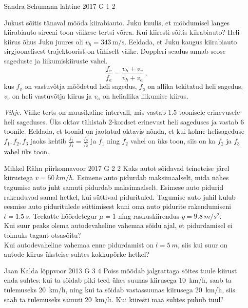 \documentclass[11pt, twoside]{article}
\begin{document}
{%
{Sandra Schumann} %
{lahtine} %
{2017} %
{G 1} %
{2} %
{
\ifStatement
Jukust sõitis tänaval mööda kiirabiauto. Juku kuulis, et möödumisel langes kiirabiauto sireeni toon väikese tertsi võrra. Kui kiiresti sõitis kiirabiauto? Heli kiirus õhus Juku juures oli $v_h = \SI{343}{\meter\per\second}$. Eeldada, et Juku kaugus kiirabiauto sirgjoonelisest trajektoorist on tühiselt väike. Doppleri seadus annab seose sageduste ja liikumiskiiruste vahel.
\[ \frac{f_v}{f_a} = \frac{v_h + v_v}{v_h + v_a} \ , \]
kus \(f_v\) on vastuvõtja mõõdetud heli sagedus, \(f_a\) on allika tekitatud heli sagedus, \(v_v\) on heli vastuvõtja kiirus ja \(v_a\) on heliallika liikumise kiirus.

\emph{Vihje}. Väike terts on muusikaline intervall, mis vastab \num{1.5}-toonisele erinevusele heli sageduses. Üks oktav tähistab 2-kordset erinevust heli sageduses ja vastab 6 toonile. Eeldada, et toonid on jaotatud oktavis nõnda, et kui kolme helisageduse $f_1, f_2, f_3$ jaoks kehtib $\frac{f_2}{f_1} = \frac{f_3}{f_2}$ ja $f_1$ ning $f_2$ vahel on üks toon, siis on ka $f_2$ ja $f_3$ vahel üks toon.
\fi
}

{Mihkel Rähn} %
{piirkonnavoor} %
{2017} %
{G 2} %
{2} %
{
\ifStatement
Kaks autot sõidavad teineteise järel kiirustega $v=\SI{50}{km/h}$. Esimene auto pidurdab maksimaalselt, mida nähes tagumise auto juht samuti pidurdab maksimaalselt. Esimese auto pidurid rakenduvad samal hetkel, kui süttivad pidurituled. Tagumise auto juhil kulub eesmise auto piduritulede süttimisest kuni oma auto pidurite rakendumiseni $t=\SI{1,5}{s}$. Teekatte hõõrdetegur $\mu=1$ ning raskuskiirendus $g=\SI{9,8}{m/s^2}$.\\
\osa Kui suur peaks olema autodevaheline vahemaa sõidu ajal, et pidurdamisel ei toimuks tagant otsasõitu?\\
\osa Kui autodevaheline vahemaa enne pidurdamist on $l=\SI{5}{m}$, siis kui suur on autode kiirus üksteise suhtes kokkupõrke hetkel?
\fi
}

{Jaan Kalda} %
{lõppvoor} %
{2013} %
{G 3} %
{4} %
{
\ifStatement
Poiss mõõdab jalgrattaga sõites tuule kiirust enda suhtes: kui ta sõidab piki teed ühes
suunas kiirusega \SI{10}{km/h}, saab ta tulemuseks \SI{20}{km/h}, ning kui ta sõidab
vastassuunas kiirusega \SI{20}{km/h}, siis saab ta tulemuseks samuti
\SI{20}{km/h}. Kui kiiresti maa suhtes puhub tuul?
\fi
}

}
\end{document}

